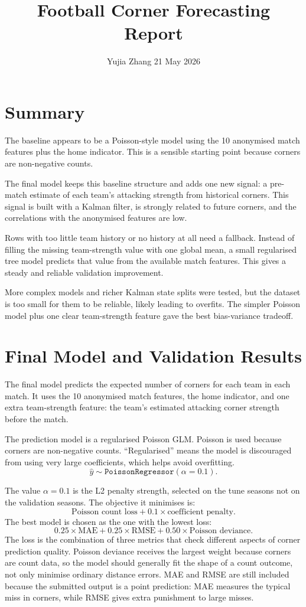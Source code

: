 \documentclass[11pt]{article}
\title{Football Corner Forecasting Report}
\author{Yujia Zhang \hfill 21 May 2026}
\date{}
\begin{document}
\maketitle

\section{Summary}

\quad \; The baseline appears to be a Poisson-style model using the 10 anonymised match
features plus the home indicator. This is a sensible starting point because
corners are non-negative counts.

The final model keeps this baseline structure and adds one new signal: a
pre-match estimate of each team's attacking strength from historical
corners. This signal is built with a Kalman filter, is strongly related to future
corners, and the correlations with the anonymised features are low.

Rows with too little team history or no history at all need a fallback. Instead of filling the
missing team-strength value with one global mean, a small regularised tree model
predicts that value from the available match features. This gives a steady and
reliable validation improvement.

More complex models and richer Kalman state splits were tested, but the dataset
is too small for them to be reliable, likely leading to overfits. The simpler Poisson model plus one clear
team-strength feature gave the best bias-variance tradeoff.

\section{Final Model and Validation Results}

The final model predicts the expected number of corners for each team in each
match. It uses the 10 anonymised match features, the home indicator, and one
extra team-strength feature: the team's estimated attacking corner strength
before the match.

The prediction model is a regularised Poisson GLM. Poisson is used because
corners are non-negative counts. ``Regularised'' means the model is discouraged
from using very large coefficients, which helps avoid overfitting.
\[
\hat{y} \sim \texttt{PoissonRegressor}(\alpha=0.1).
\]

The value \(\alpha=0.1\) is the L2 penalty strength, selected on the tune seasons not on the validation seasons. The objective it minimises is:
\[
\text{Poisson count loss} + 0.1 \times \text{coefficient penalty}.
\]
The best model is chosen as the one with the lowest loss:
\[
0.25 \times \text{MAE}
+ 0.25 \times \text{RMSE}
+ 0.50 \times \text{Poisson deviance}.
\]
The loss is the combination of three metrics that check different aspects of corner prediction quality.
Poisson deviance receives the largest weight because corners are count data, so
the model should generally fit the shape of a count outcome, not only minimise ordinary
distance errors. MAE and RMSE are still included because the submitted output is
a point prediction: MAE measures the typical miss in corners, while RMSE gives
extra punishment to large misses.
\end{document}
